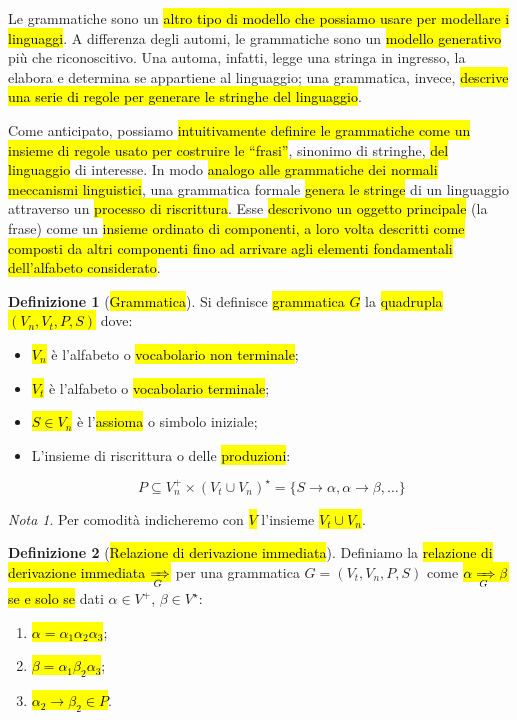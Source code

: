 \documentclass[a4paper,11pt,oneside]{article}
\theoremstyle{plain}
\theoremstyle{definition}
\newtheorem{defn}{Definizione}[section]
\theoremstyle{remark}
\newtheorem*{nota}{Nota}
\newcommand*{\deriv}[1][]{\xRightarrow[#1]{}}
\begin{document}
Le grammatiche sono un \hl{altro tipo di modello che possiamo usare per
modellare i linguaggi}. A differenza degli automi, le grammatiche sono un
\hl{modello generativo} più che riconoscitivo. Una automa, infatti, legge una
stringa in ingresso, la elabora e determina se appartiene al linguaggio; una
grammatica, invece, \hl{descrive una serie di regole per generare le stringhe
del linguaggio}.

Come anticipato, possiamo \hl{intuitivamente definire le grammatiche come un
insieme di regole usato per costruire le ``frasi''}, sinonimo di stringhe,
\hl{del linguaggio} di interesse. In modo \hl{analogo alle grammatiche dei
normali meccanismi linguistici}, una grammatica formale \hl{genera le stringe}
di un linguaggio attraverso un \hl{processo di riscrittura}. Esse \hl{descrivono
un oggetto principale} (la frase) come un \hl{insieme ordinato di componenti, a
loro volta descritti come composti da altri componenti fino ad arrivare agli
elementi fondamentali dell'alfabeto considerato}.

\begin{defn}[\hl{Grammatica}]\label{def:grammatica}
  Si definisce \hl{grammatica $G$} la \hl{quadrupla $(V_n, V_t, P, S)$} dove:

  \begin{itemize}
    \item \hl{$V_n$} è l'alfabeto o \hl{vocabolario non terminale};
    \item \hl{$V_t$} è l'alfabeto o \hl{vocabolario terminale};
    \item \hl{$S \in V_n$} è l'\hl{assioma} o simbolo iniziale;
    \item L'insieme di riscrittura o delle \hl{produzioni}:

      \begin{equation}
        P \subseteq V_n^+ \times {(V_t \cup V_n)}^\star =
          \{S \to \alpha, \alpha \to \beta, \ldots\}
      \end{equation}

  \end{itemize}
\end{defn}

\begin{nota}
  Per comodità indicheremo con \hl{$V$} l'insieme \hl{$V_t \cup V_n$}.
\end{nota}

\begin{defn}[\hl{Relazione di derivazione immediata}]\label{def:deriv}
  Definiamo la \hl{relazione di derivazione immediata $\deriv[G]$} per una
  grammatica $G = (V_t, V_n, P, S)$ come \hl{$\alpha \deriv[G] \beta$ se e solo
  se} dati $\alpha \in V^+$, $\beta \in V^\star$:

  \begin{enumerate}
    \item \hl{$\alpha = \alpha_1 \alpha_2 \alpha_3$};
    \item \hl{$\beta = \alpha_1 \beta_2 \alpha_3$};
    \item \hl{$\alpha_2 \to \beta_2 \in P$}.
  \end{enumerate}
\end{defn}
\end{document}
